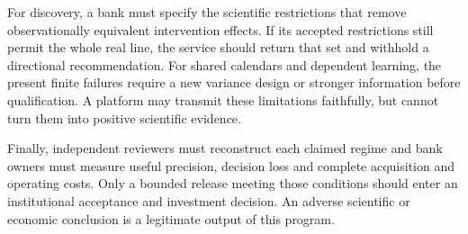 For discovery, a bank must specify the scientific restrictions that remove observationally equivalent intervention effects. If its accepted restrictions still permit the whole real line, the service should return that set and withhold a directional recommendation. For shared calendars and dependent learning, the present finite failures require a new variance design or stronger information before qualification. A platform may transmit these limitations faithfully, but cannot turn them into positive scientific evidence.

Finally, independent reviewers must reconstruct each claimed regime and bank owners must measure useful precision, decision loss and complete acquisition and operating costs. Only a bounded release meeting those conditions should enter an institutional acceptance and investment decision. An adverse scientific or economic conclusion is a legitimate output of this program.

